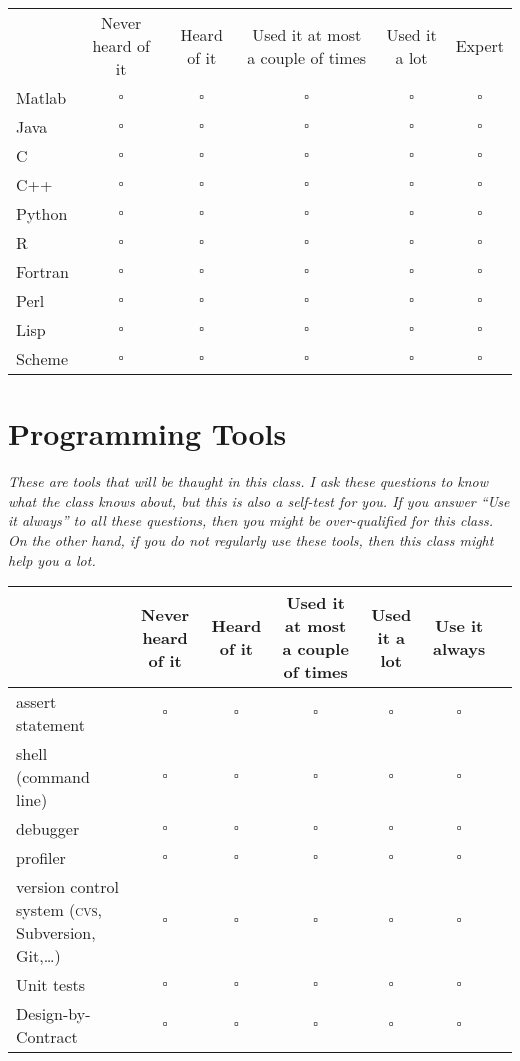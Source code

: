 \documentclass[article,twoside]{memoir}
\newcommand*{\checkbox}{$\square$}
\newcommand{\header}[1]{\textsl{#1}}
\def\th#1{#1}
\begin{document}
\begin{tabular}{lccccc}
 & \th{Never heard of it} & \th{Heard of it} & \th{Used it at most a couple of times} & \th{Used it a lot} & \th{Expert}\\
Matlab  &\checkbox &\checkbox &\checkbox &\checkbox &\checkbox \\
Java    &\checkbox &\checkbox &\checkbox &\checkbox &\checkbox \\
C       &\checkbox &\checkbox &\checkbox &\checkbox &\checkbox \\
C++     &\checkbox &\checkbox &\checkbox &\checkbox &\checkbox \\
Python  &\checkbox &\checkbox &\checkbox &\checkbox &\checkbox \\
R       &\checkbox &\checkbox &\checkbox &\checkbox &\checkbox \\
Fortran &\checkbox &\checkbox &\checkbox &\checkbox &\checkbox \\
Perl    &\checkbox &\checkbox &\checkbox &\checkbox &\checkbox \\
Lisp    &\checkbox &\checkbox &\checkbox &\checkbox &\checkbox \\
Scheme  &\checkbox &\checkbox &\checkbox &\checkbox &\checkbox \\
\end{tabular}

\section{Programming Tools}
\header{These are tools that will be thaught in this class. I ask these questions to know what the class knows about, but this is also a self-test for you. If you answer ``Use it always'' to all these questions, then you might be over-qualified for this class.  On the other hand, if you do not regularly use these tools, then this class might help you a lot.}

\begin{tabular}{lcccccc}
 \toprule
 & \th{Never heard of it} & \th{Heard of it} & \th{Used it at most a couple of times} & \th{Used it a lot} & \th{Use it always}\\
 \midrule
assert statement           &\checkbox &\checkbox &\checkbox &\checkbox &\checkbox \\
shell (command line)       &\checkbox &\checkbox &\checkbox &\checkbox &\checkbox \\
debugger                   &\checkbox &\checkbox &\checkbox &\checkbox &\checkbox \\
profiler                   &\checkbox &\checkbox &\checkbox &\checkbox &\checkbox \\
version control system (\textsc{cvs},
Subversion, Git,\dots)     &\checkbox &\checkbox &\checkbox &\checkbox &\checkbox \\
Unit tests                 &\checkbox &\checkbox &\checkbox &\checkbox &\checkbox \\
Design-by-Contract         &\checkbox &\checkbox &\checkbox &\checkbox &\checkbox \\
\end{tabular}
\end{document}
